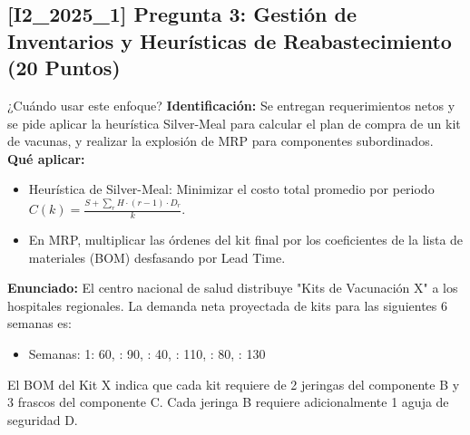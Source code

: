 \documentclass[11pt, a4paper]{article}
\begin{document}
\subsection*{[I2_2025_1] Pregunta 3: Gestión de Inventarios y Heurísticas de Reabastecimiento (20 Puntos)}
\begin{tipprueba}{¿Cuándo usar este enfoque?}
    \textbf{Identificación:} Se entregan requerimientos netos y se pide aplicar la heurística Silver-Meal para calcular el plan de compra de un kit de vacunas, y realizar la explosión de MRP para componentes subordinados.\\
    \textbf{Qué aplicar:}
    \begin{itemize}
      \item Heurística de Silver-Meal: Minimizar el costo total promedio por periodo $C(k) = \frac{S + \sum_r H \cdot (r-1) \cdot D_r}{k}$.
      \item En MRP, multiplicar las órdenes del kit final por los coeficientes de la lista de materiales (BOM) desfasando por Lead Time.
    \end{itemize}
  \end{tipprueba}

  \textbf{Enunciado:}
  El centro nacional de salud distribuye "Kits de Vacunación X" a los hospitales regionales. La demanda neta proyectada de kits para las siguientes 6 semanas es:
  \begin{itemize}
    \item Semanas: 1: 60, : 90, : 40, : 110, : 80, : 130
  \end{itemize}

  El BOM del Kit X indica que cada kit requiere de 2 jeringas del componente B y 3 frascos del componente C. Cada jeringa B requiere adicionalmente 1 aguja de seguridad D.
  
  \begin{center}
  \end{center}
\end{document}
